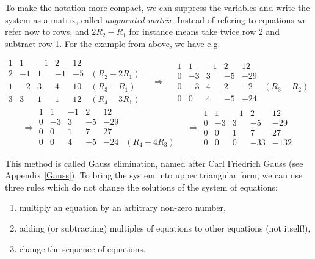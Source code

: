 \documentclass[
  a4paper,
  DIV=11,
  numbers=noendperiod,
  oneside]{scrreprt}
\theoremstyle{definition}
\theoremstyle{remark}
\begin{document}
To make the notation more compact, we can suppress the variables and
write the system as a matrix, called \emph{augmented matrix}. Instead of
refering to equations we refer now to rows, and \(2 R_2 - R_1\) for
instance means take twice row 2 and subtract row 1. For the example from
above, we have e.g.~

\[\begin{array}{rrrr|rl}
 1 &   1& -1 & 2& 12 & \\
 2 &  -1 & 1& -1 &-5 & (R_{2}-2R_{1})\\
1  &   -2& 3 & 4  & 10 & (R_{3}-R_{1})\\
3 & 3 &1 & 1 & 12  &   (R_{4}-3R_{1})
\end{array}  \quad \Rightarrow \quad 
 \begin{array}{rrrr|rl}
 1 &   1& -1 & 2& 12  &\\
 0&  -3 & 3& -5 &-29 & \\
0  &   -3& 4 & 2  & -2 & (R_{3}-R_{2}) \\
0 & 0 &4 & -5 & -24 &    
\end{array}\] \[\Rightarrow \begin{array}{rrrr|rl}
 1 &   1& -1 & 2& 12 & \\
 0&  -3 & 3& -5 &-29 &\\
0  &   0& 1 & 7  & 27 &\\
0 & 0 &4 & -5 & -24   & (R_{4}-4R_{3}) 
\end{array}
\quad \Rightarrow \begin{array}{rrrr|r}
 1 &   1& -1 & 2& 12  \\
 0&  -3 & 3& -5 &-29 \\
0  &   0& 1 & 7  & 27 \\
0 & 0 &0 & -33 & -132    
\end{array}\]

This method is called Gauss elimination, named after Carl Friedrich
Gauss (see Appendix \hyperref[Gauss]{{[}Gauss{]}}). To bring the system
into upper triangular form, we can use three rules which do not change
the solutions of the system of equations:

\begin{enumerate}
\def\labelenumi{\arabic{enumi}.}
\item
  multiply an equation by an arbitrary non-zero number,
\item
  adding (or subtracting) multiples of equations to other equations (not
  itself!),
\item
  change the sequence of equations.
\end{enumerate}
\end{document}
